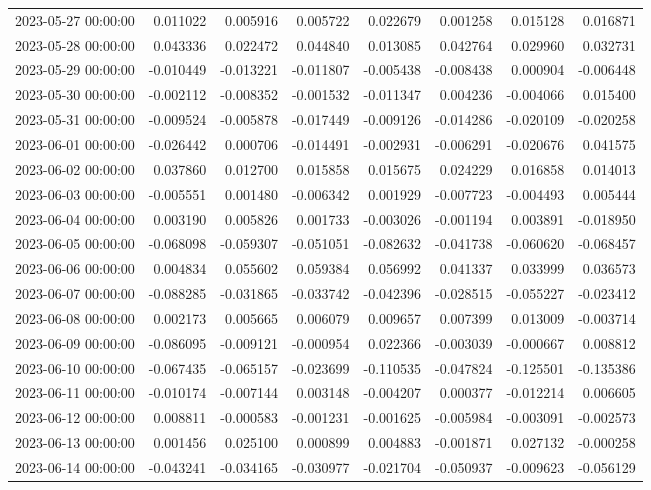 \begin{tabular}{lrrrrrrr}
2023-05-27 00:00:00 & 0.011022 & 0.005916 & 0.005722 & 0.022679 & 0.001258 & 0.015128 & 0.016871 \\
2023-05-28 00:00:00 & 0.043336 & 0.022472 & 0.044840 & 0.013085 & 0.042764 & 0.029960 & 0.032731 \\
2023-05-29 00:00:00 & -0.010449 & -0.013221 & -0.011807 & -0.005438 & -0.008438 & 0.000904 & -0.006448 \\
2023-05-30 00:00:00 & -0.002112 & -0.008352 & -0.001532 & -0.011347 & 0.004236 & -0.004066 & 0.015400 \\
2023-05-31 00:00:00 & -0.009524 & -0.005878 & -0.017449 & -0.009126 & -0.014286 & -0.020109 & -0.020258 \\
2023-06-01 00:00:00 & -0.026442 & 0.000706 & -0.014491 & -0.002931 & -0.006291 & -0.020676 & 0.041575 \\
2023-06-02 00:00:00 & 0.037860 & 0.012700 & 0.015858 & 0.015675 & 0.024229 & 0.016858 & 0.014013 \\
2023-06-03 00:00:00 & -0.005551 & 0.001480 & -0.006342 & 0.001929 & -0.007723 & -0.004493 & 0.005444 \\
2023-06-04 00:00:00 & 0.003190 & 0.005826 & 0.001733 & -0.003026 & -0.001194 & 0.003891 & -0.018950 \\
2023-06-05 00:00:00 & -0.068098 & -0.059307 & -0.051051 & -0.082632 & -0.041738 & -0.060620 & -0.068457 \\
2023-06-06 00:00:00 & 0.004834 & 0.055602 & 0.059384 & 0.056992 & 0.041337 & 0.033999 & 0.036573 \\
2023-06-07 00:00:00 & -0.088285 & -0.031865 & -0.033742 & -0.042396 & -0.028515 & -0.055227 & -0.023412 \\
2023-06-08 00:00:00 & 0.002173 & 0.005665 & 0.006079 & 0.009657 & 0.007399 & 0.013009 & -0.003714 \\
2023-06-09 00:00:00 & -0.086095 & -0.009121 & -0.000954 & 0.022366 & -0.003039 & -0.000667 & 0.008812 \\
2023-06-10 00:00:00 & -0.067435 & -0.065157 & -0.023699 & -0.110535 & -0.047824 & -0.125501 & -0.135386 \\
2023-06-11 00:00:00 & -0.010174 & -0.007144 & 0.003148 & -0.004207 & 0.000377 & -0.012214 & 0.006605 \\
2023-06-12 00:00:00 & 0.008811 & -0.000583 & -0.001231 & -0.001625 & -0.005984 & -0.003091 & -0.002573 \\
2023-06-13 00:00:00 & 0.001456 & 0.025100 & 0.000899 & 0.004883 & -0.001871 & 0.027132 & -0.000258 \\
2023-06-14 00:00:00 & -0.043241 & -0.034165 & -0.030977 & -0.021704 & -0.050937 & -0.009623 & -0.056129 \\

\end{tabular}
